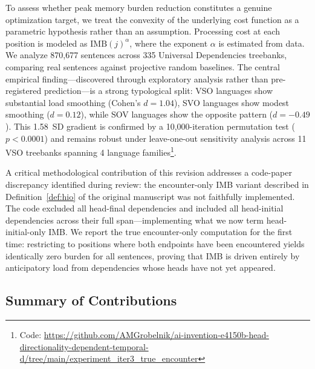 \documentclass[11pt,letterpaper]{article}
\begin{document}
To assess whether peak memory burden reduction constitutes a genuine optimization target, we treat the convexity of the underlying cost function as a parametric hypothesis rather than an assumption. Processing cost at each position is modeled as $\text{IMB}(j)^\alpha$, where the exponent $\alpha$ is estimated from data. We analyze 870,677 sentences across 335 Universal Dependencies treebanks, comparing real sentences against projective random baselines. The central empirical finding---discovered through exploratory analysis rather than pre-registered prediction---is a strong typological split: VSO languages show substantial load smoothing (Cohen's $d = 1.04$), SVO languages show modest smoothing ($d = 0.12$), while SOV languages show the opposite pattern ($d = -0.49$). This 1.58~SD gradient is confirmed by a 10,000-iteration permutation test ($p < 0.0001$) and remains robust under leave-one-out sensitivity analysis across 11 VSO treebanks spanning 4 language families\footnote{Code: \url{https://github.com/AMGrobelnik/ai-invention-e4150b-head-directionality-dependent-temporal-d/tree/main/experiment_iter3_true_encounter}}.

A critical methodological contribution of this revision addresses a code-paper discrepancy identified during review: the encounter-only IMB variant described in Definition~\ref{def:hio} of the original manuscript was not faithfully implemented. The code excluded all head-final dependencies and included all head-initial dependencies across their full span---implementing what we now term head-initial-only IMB. We report the true encounter-only computation for the first time: restricting to positions where both endpoints have been encountered yields identically zero burden for all sentences, proving that IMB is driven entirely by anticipatory load from dependencies whose heads have not yet appeared.

\subsection{Summary of Contributions}
\end{document}
